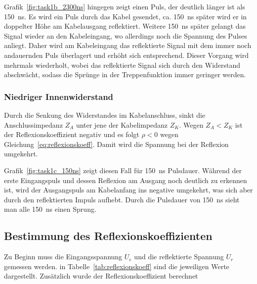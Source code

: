 \documentclass{article}
\begin{document}
Grafik~\ref{fig:task1b_2300ns} hingegen zeigt einen Puls, der deutlich länger ist als 150~ns. Es wird ein Puls durch das Kabel gesendet, ca. 150~ns später wird er in doppelter Höhe am Kabelausgang reflektiert. Weitere 150~ns später gelangt das Signal wieder an den Kabeleingang, wo allerdings noch die Spannung des Pulses anliegt. Daher wird am Kabeleingang das reflektierte Signal mit dem immer noch andauernden Puls überlagert und erhöht sich entsprechend. Dieser Vorgang wird mehrmals wiederholt, wobei das reflektierte Signal sich durch den Widerstand abschwächt, sodass die Sprünge in der Treppenfunktion immer geringer werden. 


\subsubsection{Niedriger Innenwiderstand}

Durch die Senkung des Widerstandes im Kabelanschluss, sinkt die Anschlussimpedanz $Z_A$ unter jene der Kabelimpedanz $Z_K$. Wegen $Z_A < Z_K$ ist der Reflexionskoeffizient negativ und es folgt $\rho < 0$ wegen Gleichung~\eqref{eq:reflexionskoeff}. Damit wird die Spannung bei der Reflexion umgekehrt.

Grafik~\ref{fig:task1c_150ns} zeigt diesen Fall für 150~ns Pulsdauer. Während der erste Eingangspuls und dessen Reflexion am Ausgang noch deutlich zu erkennen ist, wird der Ausgangspuls am Kabelanfang ins negative umgekehrt, was sich aber durch den reflektierten Impuls aufhebt. Durch die Pulsdauer von 150~ns sieht man alle 150~ns einen Sprung.

\subsection{Bestimmung des Reflexionskoeffizienten}

Zu Beginn muss die Eingangsspannung $U_e$ und die reflektierte Spannung $U_r$ gemessen werden. in Tabelle~\ref{tab:reflexionskoeff} sind die jeweiligen Werte dargestellt. Zusätzlich wurde der Reflexionskoeffizient berechnet
\end{document}
